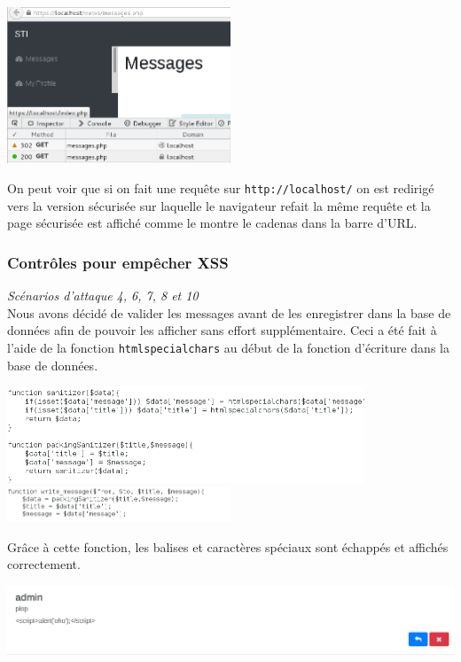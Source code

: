 \documentclass{article}
\begin{document}
\begin{center}\includegraphics[width=0.5\textwidth]{images/ssl1.png}\end{center}

On peut voir que si on fait une requête sur \texttt{http://localhost/}
on est redirigé vers la version sécurisée sur laquelle le navigateur
refait la même requête et la page sécurisée est affiché comme le montre
le cadenas dans la barre d'URL.

\subsubsection{Contrôles pour empêcher XSS}

\textit{Scénarios d'attaque 4, 6, 7, 8 et 10}\\

Nous avons décidé de valider les messages avant de les enregistrer dans
la base de données afin de pouvoir les afficher sans effort
supplémentaire. Ceci a été fait à l'aide de la fonction
\texttt{htmlspecialchars} au début de la fonction d'écriture dans la
base de données.\\

\begin{center}\includegraphics[width=0.8\textwidth]{images/sanitize.PNG}
\includegraphics[width=0.5\textwidth]{images/sanitize3.PNG}\end{center}

Grâce à cette fonction, les balises et caractères spéciaux sont
échappés et affichés correctement.

\includegraphics[width=\textwidth]{images/xss_impl1.png}
\end{document}
